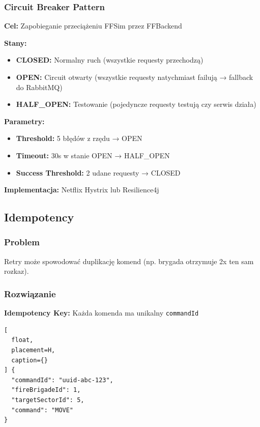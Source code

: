 \subsubsection{Circuit Breaker Pattern}

\textbf{Cel:} Zapobieganie przeciążeniu FFSim przez FFBackend

\textbf{Stany:}
\begin{itemize}
    \item \textbf{CLOSED:} Normalny ruch (wszystkie requesty przechodzą)
    \item \textbf{OPEN:} Circuit otwarty (wszystkie requesty natychmiast failują → fallback do RabbitMQ)
    \item \textbf{HALF\_OPEN:} Testowanie (pojedyncze requesty testują czy serwis działa)
\end{itemize}

\textbf{Parametry:}
\begin{itemize}
    \item \textbf{Threshold:} 5 błędów z rzędu → OPEN
    \item \textbf{Timeout:} 30s w stanie OPEN → HALF\_OPEN
    \item \textbf{Success Threshold:} 2 udane requesty → CLOSED
\end{itemize}

\textbf{Implementacja:} Netflix Hystrix lub Resilience4j

\subsection{Idempotency}

\subsubsection{Problem}

Retry może spowodować duplikację komend (np. brygada otrzymuje 2x ten sam rozkaz).

\subsubsection{Rozwiązanie}

\textbf{Idempotency Key:} Każda komenda ma unikalny \texttt{commandId}

\begin{lstlisting}[
  float,
  placement=H,
  caption={}
] {
  "commandId": "uuid-abc-123",
  "fireBrigadeId": 1,
  "targetSectorId": 5,
  "command": "MOVE"
}
\end{lstlisting}

